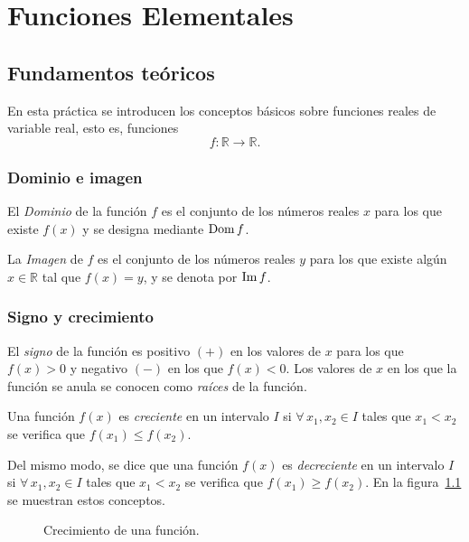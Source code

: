 
\chapter{Funciones Elementales}

\section{Fundamentos teóricos}

En esta práctica se introducen los conceptos básicos sobre funciones reales de variable real, esto es, funciones
\[f:\mathbb{R}\rightarrow \mathbb{R}.\]

\subsection{Dominio e imagen}

El \emph{Dominio} de la función $f$ es el conjunto de los números
reales $x$ para los que existe $f(x)$ y se designa mediante $\mathop{\rm Dom}\nolimits
f$.

La \emph{Imagen} de $f$ es el conjunto de los números reales $y$ para los que existe algún $x\in \mathbb{R}$ tal que $f(x)=y$, y se denota por $\mathop{\rm Im}\nolimits f$.


\subsection{Signo y crecimiento}
El \emph{signo} de la función es positivo $(+)$ en los valores de $x$ para los que $f(x)>0$ y negativo $(-)$ en los que $f(x)<0$. Los valores de $x$ en los que la función se anula se conocen como \emph{raíces} de la función.

Una función $f(x)$ es \emph{creciente} en un intervalo $I$ si $\forall\, x_1, x_2 \in I$ tales que $x_1<x_2$ se verifica que $f(x_1)\leq f(x_2)$.

Del mismo modo, se dice que una función $f(x)$ es \emph{decreciente} en un intervalo $I$ si $\forall\, x_1, x_2 \in I$ tales que $x_1<x_2$ se verifica que $f(x_1)\geq f(x_2)$. En la figura~\ref{g:crecimiento} se muestran estos conceptos.

\begin{figure}[h!]
\centering {}\qquad
{}
\caption{Crecimiento de una función.}
\label{g:crecimiento}
\end{figure}


